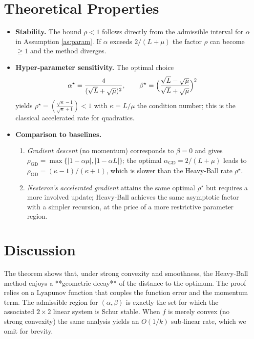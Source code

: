 \documentclass{article}
\begin{document}
\section*{Theoretical Properties}
\begin{itemize}
\item \textbf{Stability.} The bound $\rho<1$ follows directly from the admissible interval for $\alpha$ in Assumption \ref{as:param}. If $\alpha$ exceeds $2/(L+\mu)$ the factor $\rho$ can become $\ge1$ and the method diverges.
\item \textbf{Hyper‑parameter sensitivity.} The optimal choice
\[
\alpha^\star=\frac{4}{(\sqrt{L}+\sqrt{\mu})^{2}},\qquad
\beta^\star=\Bigl(\frac{\sqrt{L}-\sqrt{\mu}}{\sqrt{L}+\sqrt{\mu}}\Bigr)^{2}
\]
yields $\rho^\star=(\frac{\sqrt{\kappa}-1}{\sqrt{\kappa}+1})<1$ with $\kappa=L/\mu$ the condition number; this is the classical accelerated rate for quadratics.
\item \textbf{Comparison to baselines.}
\begin{enumerate}[label=\alph*)]
\item \emph{Gradient descent} (no momentum) corresponds to $\beta=0$ and gives $\rho_{\text{GD}}=\max\{|1-\alpha\mu|,|1-\alpha L|\}$; the optimal $\alpha_{\text{GD}}=2/(L+\mu)$ leads to $\rho_{\text{GD}}=(\kappa-1)/(\kappa+1)$, which is slower than the Heavy‑Ball rate $\rho^\star$.
\item \emph{Nesterov’s accelerated gradient} attains the same optimal $\rho^\star$ but requires a more involved update; Heavy‑Ball achieves the same asymptotic factor with a simpler recursion, at the price of a more restrictive parameter region.
\end{enumerate}
\end{itemize}

\section*{Discussion}
The theorem shows that, under strong convexity and smoothness, the Heavy‑Ball method enjoys a **geometric decay** of the distance to the optimum. The proof relies on a Lyapunov function that couples the function error and the momentum term. The admissible region for $(\alpha,\beta)$ is exactly the set for which the associated $2\times2$ linear system is Schur stable. When $f$ is merely convex (no strong convexity) the same analysis yields an $O(1/k)$ sub‑linear rate, which we omit for brevity.

\newpage
\end{document}
